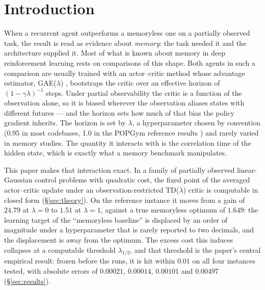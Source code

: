 
\section{Introduction}
\label{sec:intro}

When a recurrent agent outperforms a memoryless one on a partially observed
task, the result is read as evidence about \emph{memory}: the task needed it
and the architecture supplied it. Most of what is known about memory in deep
reinforcement learning rests on comparisons of this shape. Both agents in such
a comparison are usually trained with an actor--critic method whose advantage
estimator, GAE($\lambda$) \citep{schulman2016gae}, bootstraps the critic over
an effective horizon of $(1-\gamma\lambda)^{-1}$ steps. Under partial
observability the critic is a function of the observation alone, so it is
biased wherever the observation aliases states with different futures --- and
the horizon sets how much of that bias the policy gradient inherits. The
horizon is set by $\lambda$, a hyperparameter chosen by convention (0.95 in
most codebases, 1.0 in the POPGym reference results \citep{morad2023popgym})
and rarely varied in memory studies. The quantity it interacts with is the
correlation time of the hidden state, which is exactly what a memory benchmark
manipulates.

This paper makes that interaction exact. In a family of partially observed
linear-Gaussian control problems with quadratic cost, the fixed point of the
averaged actor--critic update under an observation-restricted TD($\lambda$)
critic is computable in closed form (\S\ref{sec:theory}). On the reference
instance it moves from a gain of $24.79$ at $\lambda=0$ to $1.51$ at
$\lambda=1$, against a true memoryless optimum of $1.649$: the learning target
of the ``memoryless baseline'' is displaced by an order of magnitude under a
hyperparameter that is rarely reported to two decimals, and the displacement
is away from the optimum. The excess cost this induces collapses at a
computable threshold $\lambda_{1/2}$, and that threshold is the paper's central
empirical result: frozen before the runs, it is hit within $0.01$ on all four
instances tested, with absolute errors of $0.00021$, $0.00014$, $0.00101$ and
$0.00497$ (\S\ref{sec:results}).

